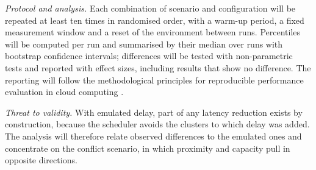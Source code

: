 \emph{Protocol and analysis.} Each combination of scenario and configuration will be repeated at least ten times in randomised order, with a warm-up period, a fixed measurement window and a reset of the environment between runs. Percentiles will be computed per run and summarised by their median over runs with bootstrap confidence intervals; differences will be tested with non-parametric tests and reported with effect sizes, including results that show no difference. The reporting will follow the methodological principles for reproducible performance evaluation in cloud computing \cite{papadopoulos2021methodological}.

\emph{Threat to validity.} With emulated delay, part of any latency reduction exists by construction, because the scheduler avoids the clusters to which delay was added. The analysis will therefore relate observed differences to the emulated ones and concentrate on the conflict scenario, in which proximity and capacity pull in opposite directions.
